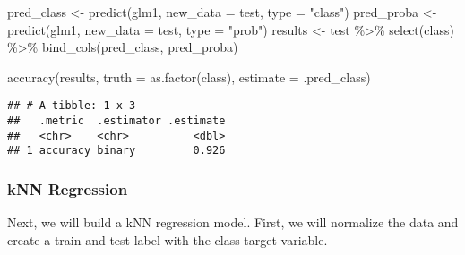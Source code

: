 \documentclass[
]{article}
\newenvironment{Shaded}{\begin{snugshade}}{\end{snugshade}}
\newcommand{\AttributeTok}[1]{\textcolor[rgb]{0.77,0.63,0.00}{#1}}
\newcommand{\FunctionTok}[1]{\textcolor[rgb]{0.00,0.00,0.00}{#1}}
\newcommand{\NormalTok}[1]{#1}
\newcommand{\OtherTok}[1]{\textcolor[rgb]{0.56,0.35,0.01}{#1}}
\newcommand{\SpecialCharTok}[1]{\textcolor[rgb]{0.00,0.00,0.00}{#1}}
\newcommand{\StringTok}[1]{\textcolor[rgb]{0.31,0.60,0.02}{#1}}
\begin{document}
\begin{Shaded}
\begin{Highlighting}[]
\NormalTok{pred\_class }\OtherTok{\textless{}{-}} \FunctionTok{predict}\NormalTok{(glm1,}
                      \AttributeTok{new\_data =}\NormalTok{ test,}
                      \AttributeTok{type =} \StringTok{"class"}\NormalTok{)}
\NormalTok{pred\_proba }\OtherTok{\textless{}{-}} \FunctionTok{predict}\NormalTok{(glm1,}
                      \AttributeTok{new\_data =}\NormalTok{ test,}
                      \AttributeTok{type =} \StringTok{"prob"}\NormalTok{)}
\NormalTok{results }\OtherTok{\textless{}{-}}\NormalTok{ test }\SpecialCharTok{\%\textgreater{}\%}
           \FunctionTok{select}\NormalTok{(class) }\SpecialCharTok{\%\textgreater{}\%}
           \FunctionTok{bind\_cols}\NormalTok{(pred\_class, pred\_proba)}

\FunctionTok{accuracy}\NormalTok{(results, }\AttributeTok{truth =} \FunctionTok{as.factor}\NormalTok{(class), }\AttributeTok{estimate =}\NormalTok{ .pred\_class)}
\end{Highlighting}
\end{Shaded}

\begin{verbatim}
## # A tibble: 1 x 3
##   .metric  .estimator .estimate
##   <chr>    <chr>          <dbl>
## 1 accuracy binary         0.926
\end{verbatim}

\hypertarget{knn-regression}{%
\subsubsection{kNN Regression}\label{knn-regression}}

Next, we will build a kNN regression model. First, we will normalize the
data and create a train and test label with the class target variable.
\end{document}
